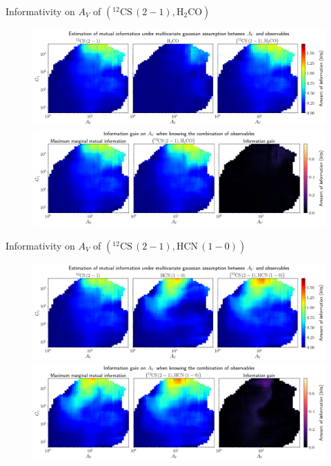 \documentclass{beamer}
\begin{document}
\begin{frame}{Informativity on $A_V$ of $\left(\mathrm{^{12}CS\,(2-1)},\mathrm{H_2CO}\right)$}
    \begin{figure}
        \centering
        \includegraphics[width=0.95\linewidth]{../linearinfogauss/av__12cs21_h2co_linearinfogauss.png}
        \vfill
        \includegraphics[width=0.95\linewidth]{../linearinfogauss/av__12cs21_h2co_linearinfogauss_gain.png}
    \end{figure}
\end{frame}

\begin{frame}{Informativity on $A_V$ of $\left(\mathrm{^{12}CS\,(2-1)},\mathrm{HCN\,(1-0)}\right)$}
    \begin{figure}
        \centering
        \includegraphics[width=0.95\linewidth]{../linearinfogauss/av__12cs21_hcn10_linearinfogauss.png}
        \vfill
        \includegraphics[width=0.95\linewidth]{../linearinfogauss/av__12cs21_hcn10_linearinfogauss_gain.png}
    \end{figure}
\end{frame}
\end{document}

